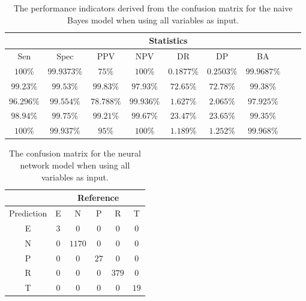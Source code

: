 \begin{table}[!ht]
	\centering
	\begin{tabular}{|c|c|c|c|c|c|c|c|c|}
		\hline
		 & \multicolumn{7}{c|}{Statistics} \\ \hline
		Sen & Spec & PPV & NPV & DR & DP & BA \\ \hline
		$100\%$ & $99.9373\%$ & $75\%$ & $100\%$ & $0.1877\%$ & $0.2503\%$ & $99.9687\%$ \\ \hline
		$99.23\%$ & $99.53\%$ & $99.83\%$ & $97.93\%$ & $72.65\%$ & $72.78\%$ & $99.38\%$ \\ \hline
		$96.296\%$ & $99.554\%$ & $78.788\%$ & $99.936\%$ & $1.627\%$ & $2.065\%$ & $97.925\%$ \\ \hline
		$98.94\%$ & $99.75\%$ & $99.21\%$ & $99.67\%$ & $23.47\%$ & $23.65\%$ & $99.35\%$ \\ \hline
		$100\%$ & $99.937\%$ & $95\%$ & $100\%$ & $1.189\%$ & $1.252\%$ & $99.968\%$ \\ \hline
	\end{tabular}
	\caption{The performance indicators derived from the confusion matrix for the naive Bayes model when using all variables as input.}
	\label{tab:cs:all:nb}
\end{table}

\begin{table}[!ht]
	\centering
	\begin{tabular}{|c|c|c|c|c|c|}
		\hline
		 & \multicolumn{5}{|c|}{Reference} \\ \hline
		 Prediction & E & N & P & R & T \\ \hline
		 E & $3$ & $0$ & $0$ & $0$ & $0$ \\ \hline
		 N & $0$ & $1170$ & $0$ & $0$ & $0$ \\ \hline
		 P & $0$ & $0$ & $27$ & $0$ & $0$ \\ \hline
		 R & $0$ & $0$ & $0$ & $379$ & $0$ \\ \hline
		 T & $0$ & $0$ & $0$ & $0$ & $19$ \\ \hline
	\end{tabular}
	\caption{The confusion matrix for the neural network model when using all variables as input.}
	\label{tab:cm:all:nnet}
\end{table}

